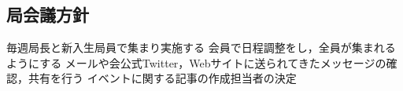 \subsection*{局会議方針}


毎週局長と新入生局員で集まり実施する
会員で日程調整をし，全員が集まれるようにする
メールや会公式Twitter，Webサイトに送られてきたメッセージの確認，共有を行う
イベントに関する記事の作成担当者の決定

